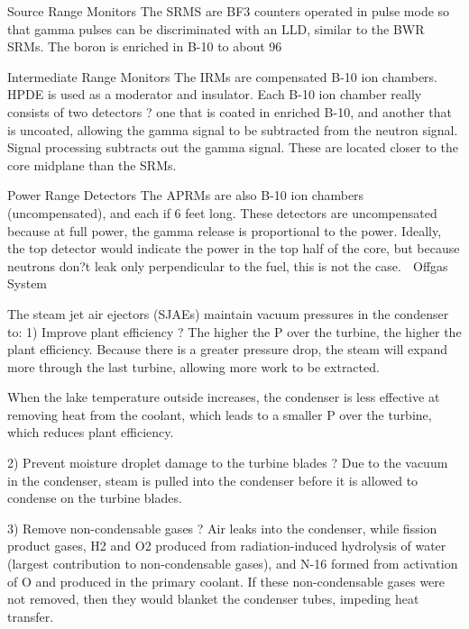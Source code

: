 \documentclass[10pt]{article}
\begin{document}
Source Range Monitors
The SRMS are BF3 counters operated in pulse mode so that gamma pulses can be discriminated with an LLD, similar to the BWR SRMs. The boron is enriched in B-10 to about 96%

Intermediate Range Monitors
The IRMs are compensated B-10 ion chambers. HPDE is used as a moderator and insulator. Each B-10 ion chamber really consists of two detectors ? one that is coated in enriched B-10, and another that is uncoated, allowing the gamma signal to be subtracted from the neutron signal. Signal processing subtracts out the gamma signal. These are located closer to the core midplane than the SRMs. 

Power Range Detectors
The APRMs are also B-10 ion chambers (uncompensated), and each if 6 feet long. These detectors are uncompensated because at full power, the gamma release is proportional to the power. Ideally, the top detector would indicate the power in the top half of the core, but because neutrons don?t leak only perpendicular to the fuel, this is not the case. 
Offgas System

The steam jet air ejectors (SJAEs) maintain vacuum pressures in the condenser to:
1)	Improve plant efficiency ? The higher the P over the turbine, the higher the plant efficiency. Because there is a greater pressure drop, the steam will expand more through the last turbine, allowing more work to be extracted. 



When the lake temperature outside increases, the condenser is less effective at removing heat from the coolant, which leads to a smaller P over the turbine, which reduces plant efficiency. 

2)	Prevent moisture droplet damage to the turbine blades ? Due to the vacuum in the condenser, steam is pulled into the condenser before it is allowed to condense on the turbine blades. 

3)	Remove non-condensable gases ? Air leaks into the condenser, while fission product gases, H2 and O2 produced from radiation-induced hydrolysis of water (largest contribution to non-condensable gases), and N-16 formed from activation of O and produced in the primary coolant. If these non-condensable gases were not removed, then they would blanket the condenser tubes, impeding heat transfer. 
\end{document}
